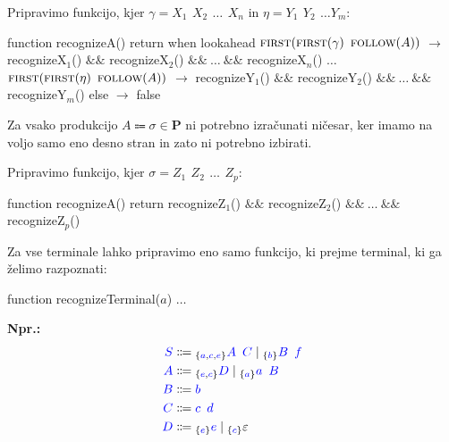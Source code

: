 \documentclass{article}
\newcommand{\Ex}{\textbf{Npr.:}\ }
\newcommand{\FIRST}{\textsc{first}}
\newcommand{\FOLLOW}{\textsc{follow}}
\newcommand{\Set}[1]{\mathbf{#1}}
\newcommand{\Symbol}[1]{\textcolor{blue}{#1}}
\newcommand{\Productions}{\Set{P}}
\newcommand{\Null}{\varepsilon}
\newcommand{\Arrow}{\Coloneq}
\newcommand{\Seq}{{\ \,}}
\newcommand{\Union}{\mathrel{|}}
\newcommand{\Lookahead}[1]{{}_{\{{#1}\}}}
\begin{document}
Pripravimo funkcijo, kjer $\gamma = X_1 \Seq X_2 \Seq \dots \Seq X_n$ in $\eta = Y_1 \Seq Y_2 \Seq \dots Y_m$:

\begin{algorithm}
  function recognizeA()
    return when lookahead
      $\FIRST(\FIRST(\gamma) \Seq \FOLLOW(A))$ $\rightarrow$ recognizeX$_1$() $\&\&$ recognizeX$_2$() $\&\&\ \dots\ \&\&$ recognizeX$_n$()
      $\dots$
      $\FIRST(\FIRST(\eta) \Seq \FOLLOW(A))$ $\rightarrow$ recognizeY$_1$() $\&\&$ recognizeY$_2$() $\&\&\ \dots\ \&\&$ recognizeY$_m$()
      else $\rightarrow$ false
\end{algorithm}

Za vsako produkcijo $A \Arrow \sigma \in \Productions$ ni potrebno izračunati ničesar, ker imamo na voljo samo eno desno stran in zato ni potrebno izbirati.

Pripravimo funkcijo, kjer $\sigma = Z_1 \Seq Z_2 \Seq \dots \Seq Z_p$:

\begin{algorithm}
  function recognizeA()
    return recognizeZ$_1$() $\&\&$ recognizeZ$_2$() $\&\&\ \dots\ \&\&$ recognizeZ$_p$()
\end{algorithm}

Za vse terminale lahko pripravimo eno samo funkcijo, ki prejme terminal, ki ga želimo razpoznati:
\begin{algorithm}
  function recognizeTerminal($a$)
    $\dots$
\end{algorithm}

\Ex
\begin{equation*}
  \begin{aligned}
    \Symbol{S} &\Arrow \Lookahead{\Symbol{a}, \Symbol{c}, \Symbol{e}} \Symbol{A} \Seq \Symbol{C} \Union \Lookahead{\Symbol{b}} \Symbol{B} \Seq \Symbol{f} \\
    \Symbol{A} &\Arrow \Lookahead{\Symbol{e}, \Symbol{c}} \Symbol{D} \Union \Lookahead{\Symbol{a}} \Symbol{a} \Seq \Symbol{B} \\
    \Symbol{B} &\Arrow \Symbol{b}\\
    \Symbol{C} &\Arrow \Symbol{c} \Seq \Symbol{d}\\
    \Symbol{D} &\Arrow \Lookahead{\Symbol{e}} \Symbol{e} \Union \Lookahead{\Symbol{c}} \Null
  \end{aligned}
\end{equation*}
\end{document}
